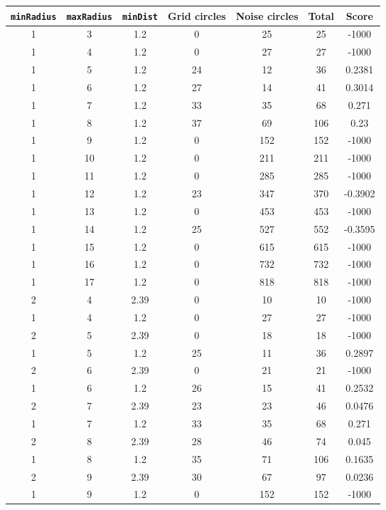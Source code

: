 \documentclass[letterpaper, 12pt]{article}
\begin{document}
\begin{longtable}{|c|c|c|c|c|c|c|}
\hline
\textbf{\texttt{minRadius}} & \textbf{\texttt{maxRadius}} & \textbf{\texttt{minDist}} & \textbf{Grid circles} & \textbf{Noise circles} & \textbf{Total} & \textbf{Score} \\
\hline
1 & 3 & 1.2 & 0 & 25 & 25 & -1000 \\
\hline
1 & 4 & 1.2 & 0 & 27 & 27 & -1000 \\
\hline
1 & 5 & 1.2 & 24 & 12 & 36 & 0.2381 \\
\hline
1 & 6 & 1.2 & 27 & 14 & 41 & 0.3014 \\
\hline
1 & 7 & 1.2 & 33 & 35 & 68 & 0.271 \\
\hline
1 & 8 & 1.2 & 37 & 69 & 106 & 0.23 \\
\hline
1 & 9 & 1.2 & 0 & 152 & 152 & -1000 \\
\hline
1 & 10 & 1.2 & 0 & 211 & 211 & -1000 \\
\hline
1 & 11 & 1.2 & 0 & 285 & 285 & -1000 \\
\hline
1 & 12 & 1.2 & 23 & 347 & 370 & -0.3902 \\
\hline
1 & 13 & 1.2 & 0 & 453 & 453 & -1000 \\
\hline
1 & 14 & 1.2 & 25 & 527 & 552 & -0.3595 \\
\hline
1 & 15 & 1.2 & 0 & 615 & 615 & -1000 \\
\hline
1 & 16 & 1.2 & 0 & 732 & 732 & -1000 \\
\hline
1 & 17 & 1.2 & 0 & 818 & 818 & -1000 \\
\hline
2 & 4 & 2.39 & 0 & 10 & 10 & -1000 \\
\hline
1 & 4 & 1.2 & 0 & 27 & 27 & -1000 \\
\hline
2 & 5 & 2.39 & 0 & 18 & 18 & -1000 \\
\hline
1 & 5 & 1.2 & 25 & 11 & 36 & 0.2897 \\
\hline
2 & 6 & 2.39 & 0 & 21 & 21 & -1000 \\
\hline
1 & 6 & 1.2 & 26 & 15 & 41 & 0.2532 \\
\hline
2 & 7 & 2.39 & 23 & 23 & 46 & 0.0476 \\
\hline
1 & 7 & 1.2 & 33 & 35 & 68 & 0.271 \\
\hline
2 & 8 & 2.39 & 28 & 46 & 74 & 0.045 \\
\hline
1 & 8 & 1.2 & 35 & 71 & 106 & 0.1635 \\
\hline
2 & 9 & 2.39 & 30 & 67 & 97 & 0.0236 \\
\hline
1 & 9 & 1.2 & 0 & 152 & 152 & -1000 \\

\end{longtable}
\end{document}
